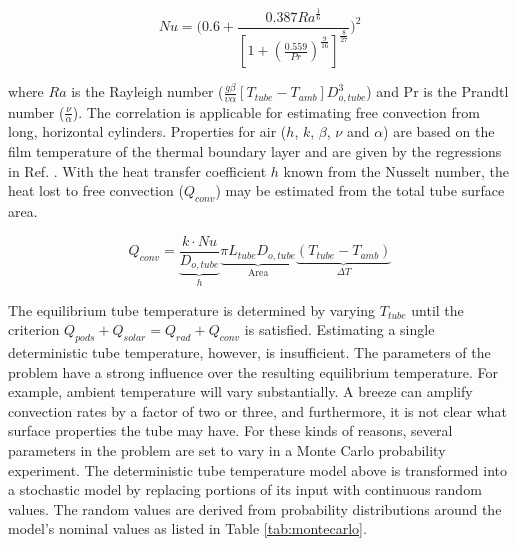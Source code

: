 \documentclass[heading.tex]{subfiles}
\begin{document}

\begin{equation}
Nu = \Bigg(0.6 + \frac{0.387Ra^{\frac{1}{6}}}{[1+(\frac{0.559}{Pr})^{\frac{9}{16}}]^{\frac{8}{27}}}\Bigg)^2
\end{equation}

where $Ra$ is the Rayleigh number
($\frac{g \beta} {\upsilon\alpha}  [T_{tube}-T_{amb}] {D}_{o,tube}^3$)
and Pr is the Prandtl number ($\frac{\nu}{\alpha}$).
The correlation is applicable for estimating free convection from long,
horizontal cylinders. Properties for air ($h$, $k$, $\beta$, $\nu$ and $\alpha$)
are based on the film temperature of the thermal boundary layer
and are given by the regressions in Ref. .
With the heat transfer coefficient $h$ known from the Nusselt number,
the heat lost to free convection ($Q_{conv}$) may be estimated from the total tube surface area.

\begin{equation}
Q_{conv} = \underbrace{ \frac{k\cdot Nu}{ {D}_{o,tube}} }_\text{$h$}
 \underbrace{ \pi {L}_{tube} {D}_{o,tube} }_\text{Area} 
 \underbrace{ (T_{tube}-T_{amb})  }_\text{$\Delta T$} 
\end{equation}


The equilibrium tube temperature is determined by varying $T_{tube}$ until the criterion
$Q_{pods} + Q_{solar} = Q_{rad} + Q_{conv}$ is satisfied.
Estimating a single deterministic tube temperature, however, is insufficient.
The parameters of the problem have a strong influence over the resulting equilibrium
temperature. For example, ambient temperature will vary substantially.
A breeze can amplify convection rates by a factor of two or three,
and furthermore,
it is not clear what surface properties the tube may have.
For these kinds of reasons, several parameters in the problem are set to vary in 
a Monte Carlo probability experiment.
The deterministic tube temperature model above is transformed into a stochastic model by
replacing portions of its input with continuous random values.
The random values are derived from probability distributions
around the model's nominal values as listed in Table \ref{tab:montecarlo}.
\end{document}
